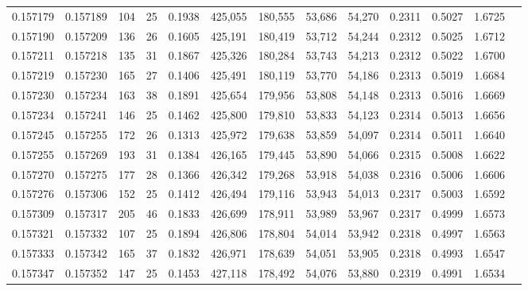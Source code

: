 \begin{tabular}{rrrrrrrrrrrrr}
0.157179 & 0.157189 &   104 &  25 &                                     0.1938 & 425,055 & 180,555 &  53,686 &  54,270 & 0.2311 & 0.5027 & 1.6725 \\
0.157190 & 0.157209 &   136 &  26 &                                     0.1605 & 425,191 & 180,419 &  53,712 &  54,244 & 0.2312 & 0.5025 & 1.6712 \\
0.157211 & 0.157218 &   135 &  31 &                                     0.1867 & 425,326 & 180,284 &  53,743 &  54,213 & 0.2312 & 0.5022 & 1.6700 \\
0.157219 & 0.157230 &   165 &  27 &                                     0.1406 & 425,491 & 180,119 &  53,770 &  54,186 & 0.2313 & 0.5019 & 1.6684 \\
0.157230 & 0.157234 &   163 &  38 &                                     0.1891 & 425,654 & 179,956 &  53,808 &  54,148 & 0.2313 & 0.5016 & 1.6669 \\
0.157234 & 0.157241 &   146 &  25 &                                     0.1462 & 425,800 & 179,810 &  53,833 &  54,123 & 0.2314 & 0.5013 & 1.6656 \\
0.157245 & 0.157255 &   172 &  26 &                                     0.1313 & 425,972 & 179,638 &  53,859 &  54,097 & 0.2314 & 0.5011 & 1.6640 \\
0.157255 & 0.157269 &   193 &  31 &                                     0.1384 & 426,165 & 179,445 &  53,890 &  54,066 & 0.2315 & 0.5008 & 1.6622 \\
0.157270 & 0.157275 &   177 &  28 &                                     0.1366 & 426,342 & 179,268 &  53,918 &  54,038 & 0.2316 & 0.5006 & 1.6606 \\
0.157276 & 0.157306 &   152 &  25 &                                     0.1412 & 426,494 & 179,116 &  53,943 &  54,013 & 0.2317 & 0.5003 & 1.6592 \\
0.157309 & 0.157317 &   205 &  46 &                                     0.1833 & 426,699 & 178,911 &  53,989 &  53,967 & 0.2317 & 0.4999 & 1.6573 \\
0.157321 & 0.157332 &   107 &  25 &                                     0.1894 & 426,806 & 178,804 &  54,014 &  53,942 & 0.2318 & 0.4997 & 1.6563 \\
0.157333 & 0.157342 &   165 &  37 &                                     0.1832 & 426,971 & 178,639 &  54,051 &  53,905 & 0.2318 & 0.4993 & 1.6547 \\
0.157347 & 0.157352 &   147 &  25 &                                     0.1453 & 427,118 & 178,492 &  54,076 &  53,880 & 0.2319 & 0.4991 & 1.6534 \\

\end{tabular}
